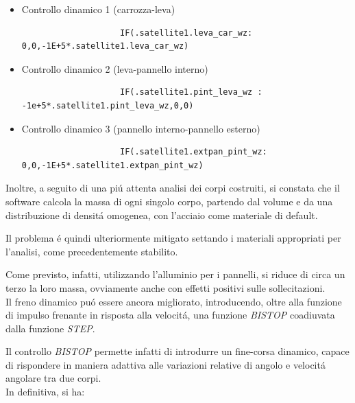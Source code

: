 \documentclass{article}
\begin{document}
        \begin{itemize}
            \item Controllo dinamico 1 (carrozza-leva) 
                \begin{lstlisting}
                    IF(.satellite1.leva_car_wz: 0,0,-1E+5*.satellite1.leva_car_wz)
                \end{lstlisting}
            \item Controllo dinamico 2 (leva-pannello interno) 
                \begin{lstlisting}
                    IF(.satellite1.pint_leva_wz : -1e+5*.satellite1.pint_leva_wz,0,0)
                \end{lstlisting}
            \item Controllo dinamico 3 (pannello interno-pannello esterno)  
                \begin{lstlisting}
                    IF(.satellite1.extpan_pint_wz: 0,0,-1E+5*.satellite1.extpan_pint_wz)
                \end{lstlisting}
        \end{itemize}

        Inoltre, a seguito di una piú attenta analisi dei corpi costruiti, si constata che il software
        calcola la massa di ogni singolo corpo, partendo dal volume e da una distribuzione di densitá omogenea, 
        con l'acciaio come materiale di default.

        Il problema é quindi ulteriormente mitigato settando i materiali appropriati per l'analisi, come 
        precedentemente stabilito. 
        
        Come previsto, infatti, utilizzando l'alluminio per i pannelli,
        si riduce di circa un terzo la loro massa, ovviamente anche con effetti positivi sulle sollecitazioni. \\ 

        Il freno dinamico puó essere ancora migliorato, introducendo, oltre alla funzione
        di impulso frenante in risposta alla velocitá, una funzione \textit{BISTOP} coadiuvata dalla funzione
        \textit{STEP}.

        Il controllo \textit{BISTOP} permette infatti di introdurre un fine-corsa dinamico, capace di rispondere
        in maniera adattiva alle variazioni relative di angolo e velocitá angolare tra due corpi. \\ 

        In definitiva, si ha: 
\end{document}
